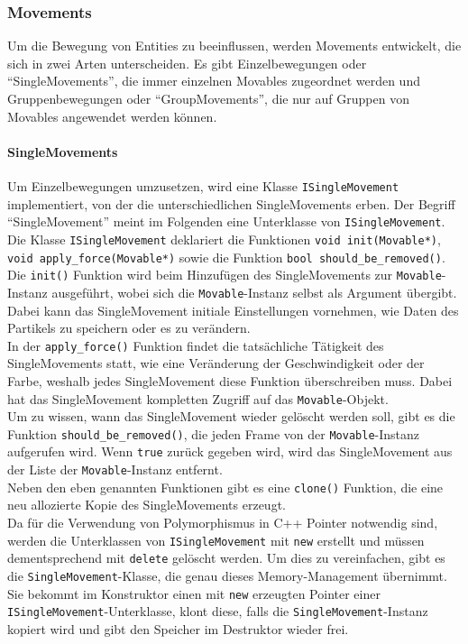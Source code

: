\documentclass[11pt,a4paper]{article}
\begin{document}
\subsubsection{Movements}
Um die Bewegung von Entities zu beeinflussen, werden Movements entwickelt, die sich in zwei Arten unterscheiden. Es gibt Einzelbewegungen oder ``SingleMovements'', die immer einzelnen Movables zugeordnet werden und Gruppenbewegungen oder ``GroupMovements'', die nur auf Gruppen von Movables angewendet werden können.

\paragraph{SingleMovements}
Um Einzelbewegungen umzusetzen, wird eine Klasse \lstinline!ISingleMovement! implementiert, von der die unterschiedlichen SingleMovements erben. Der Begriff ``SingleMovement'' meint im Folgenden eine Unterklasse von \lstinline!ISingleMovement!. Die Klasse \lstinline!ISingleMovement! deklariert die Funktionen \lstinline!void init(Movable*)!, \lstinline!void apply_force(Movable*)! sowie die Funktion \lstinline!bool should_be_removed()!. Die \lstinline!init()! Funktion wird beim Hinzufügen des SingleMovements zur \lstinline!Movable!-Instanz ausgeführt, wobei sich die \lstinline!Movable!-Instanz selbst als Argument übergibt. Dabei kann das SingleMovement initiale Einstellungen vornehmen, wie Daten des Partikels zu speichern oder es zu verändern.\\
In der \lstinline!apply_force()! Funktion findet die tatsächliche Tätigkeit des SingleMovements statt, wie eine Veränderung der Geschwindigkeit oder der Farbe, weshalb jedes SingleMovement diese Funktion überschreiben muss. Dabei hat das SingleMovement kompletten Zugriff auf das \lstinline!Movable!-Objekt.\\
Um zu wissen, wann das SingleMovement wieder gelöscht werden soll, gibt es die Funktion \lstinline!should_be_removed()!, die jeden Frame von der \lstinline!Movable!-Instanz aufgerufen wird. Wenn \lstinline!true! zurück gegeben wird, wird das SingleMovement aus der Liste der \lstinline!Movable!-Instanz entfernt.\\
Neben den eben genannten Funktionen gibt es eine \lstinline!clone()! Funktion, die eine neu allozierte Kopie des SingleMovements erzeugt.\\
Da für die Verwendung von Polymorphismus in C++ Pointer notwendig sind, werden die Unterklassen von \lstinline!ISingleMovement! mit \lstinline!new! erstellt und müssen dementsprechend mit \lstinline!delete! gelöscht werden. Um dies zu vereinfachen, gibt es die \lstinline!SingleMovement!-Klasse, die genau dieses Memory-Management übernimmt. Sie bekommt im Konstruktor einen mit \lstinline!new! erzeugten Pointer einer \lstinline!ISingleMovement!-Unterklasse, klont diese, falls die \lstinline!SingleMovement!-Instanz kopiert wird und gibt den Speicher im Destruktor wieder frei.
\end{document}
